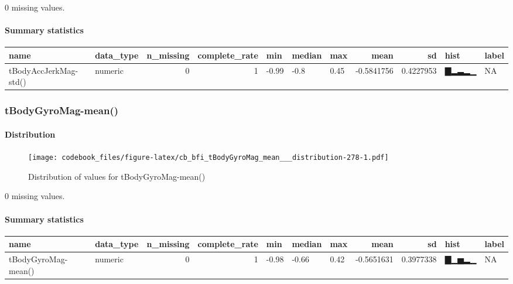 \documentclass[
]{article}
\begin{document}
0 missing values.

\hypertarget{tBodyAccJerkMag_std___summary}{%
\paragraph{Summary statistics}\label{tBodyAccJerkMag_std___summary}}

\begin{longtable}[]{@{}llrrlllrrll@{}}
\toprule
name & data\_type & n\_missing & complete\_rate & min & median & max &
mean & sd & hist & label \\
\midrule
\endhead
tBodyAccJerkMag-std() & numeric & 0 & 1 & -0.99 & -0.8 & 0.45 &
-0.5841756 & 0.4227953 & ▇▂▃▂▁ & NA \\
\bottomrule
\end{longtable}

\hypertarget{tBodyGyroMag_mean__}{%
\subsubsection{tBodyGyroMag-mean()}\label{tBodyGyroMag_mean__}}

\hypertarget{tBodyGyroMag_mean___distribution}{%
\paragraph{Distribution}\label{tBodyGyroMag_mean___distribution}}

\begin{figure}
\centering
\texttt{[image: codebook\_files/figure-latex/cb\_bfi\_tBodyGyroMag\_mean\_\_\_distribution-278-1.pdf]}
\caption{Distribution of values for tBodyGyroMag-mean()}
\end{figure}

0 missing values.

\hypertarget{tBodyGyroMag_mean___summary}{%
\paragraph{Summary statistics}\label{tBodyGyroMag_mean___summary}}

\begin{longtable}[]{@{}llrrlllrrll@{}}
\toprule
name & data\_type & n\_missing & complete\_rate & min & median & max &
mean & sd & hist & label \\
\midrule
\endhead
tBodyGyroMag-mean() & numeric & 0 & 1 & -0.98 & -0.66 & 0.42 &
-0.5651631 & 0.3977338 & ▇▁▅▂▁ & NA \\
\bottomrule
\end{longtable}
\end{document}
